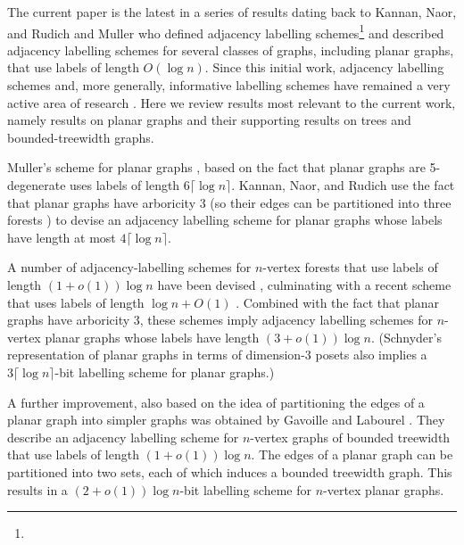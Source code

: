 \documentclass[kpfonts]{patmorin}
\begin{document}
The current paper is the latest in a series of results dating back to Kannan, Naor, and Rudich \cite{kannan.naor.ea:implicit0,kannan.naor.ea:implicit} and Muller \cite{muller:local} who defined adjacency labelling schemes\footnote{} and described adjacency labelling schemes for several classes of graphs, including planar graphs, that use labels of length $O(\log n)$.  Since this initial work, adjacency labelling schemes and, more generally, informative labelling schemes have remained a very active area of research \cite{alstrup.kaplan.ea:adjacency,abrahamsen.alstrup.ea:near-optimal,alstrup.dahlgaard.ea:sublinear,alstrup.gortz.ea:distance,alstrup.gavoille.ea:simpler,alstrup.rauhe:improved,X,X,X,X,X}. Here we review results most relevant to the current work, namely results on planar graphs and their supporting results on trees and bounded-treewidth graphs.

Muller's scheme for planar graphs \cite{muller:local}, based on the fact that planar graphs are 5-degenerate uses labels of length $6\lceil\log n\rceil$.  Kannan, Naor, and Rudich \cite{kannan.naor.ea:implicit} use the fact that planar graphs have arboricity 3 (so their edges can be partitioned into three forests \cite{nash-williams:edge-disjoint}) to devise an adjacency labelling scheme for planar graphs whose labels have length at most $4\lceil\log n\rceil$.  

A number of adjacency-labelling schemes for $n$-vertex forests that use labels of length $(1+o(1))\log n$ have been devised \cite{chung:universal, alstrup.rauhe:improved,alstrup.dahlgaard.ea:optimal}, culminating with a recent scheme that uses labels of length $\log n + O(1)$ \cite{alstrup.dahlgaard.ea:optimal}.  Combined with the fact that planar graphs have arboricity 3, these schemes imply adjacency labelling schemes for $n$-vertex planar graphs whose labels have length $(3+o(1))\log n$.   (Schnyder's representation of planar graphs in terms of dimension-3 posets \cite{schnyder:planar} also implies a $3\lceil\log n\rceil$-bit labelling scheme for planar graphs.)

A further improvement, also based on the idea of partitioning the edges of a planar graph into simpler graphs was obtained by Gavoille and Labourel \cite{gavoille.labourel:shorter}.  They describe an adjacency labelling scheme for $n$-vertex graphs of bounded treewidth that use labels of length $(1+o(1))\log n$.  The edges of a planar graph can be partitioned into two sets, each of which induces a bounded treewidth graph.  This results in a $(2+o(1))\log n$-bit labelling scheme for $n$-vertex planar graphs.
\end{document}

